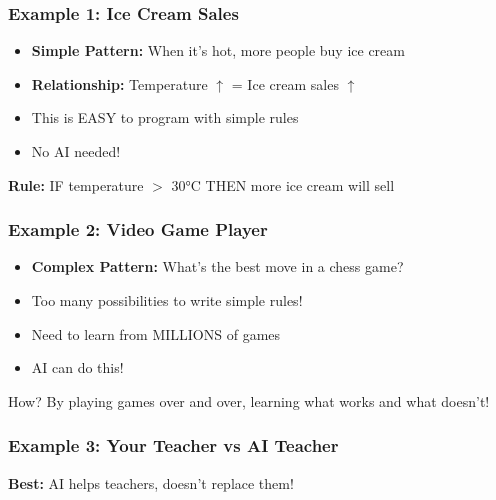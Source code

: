 \begin{frame}[fragile]\frametitle{Example 1: Ice Cream Sales}
\begin{itemize}
\item {\bf Simple Pattern:} When it's hot, more people buy ice cream
\item {\bf Relationship:} Temperature $\uparrow$ = Ice cream sales $\uparrow$
\item This is EASY to program with simple rules
\item No AI needed!
\end{itemize}

\vspace{0.5cm}
{\bf Rule:} IF temperature $>$ 30°C THEN more ice cream will sell
\end{frame}

\begin{frame}[fragile]\frametitle{Example 2: Video Game Player}
\begin{itemize}
\item {\bf Complex Pattern:} What's the best move in a chess game?
\item Too many possibilities to write simple rules!
\item Need to learn from MILLIONS of games
\item AI can do this!
\end{itemize}

\vspace{0.5cm}
How? By playing games over and over, learning what works and what doesn't!
\end{frame}

\begin{frame}[fragile]\frametitle{Example 3: Your Teacher vs AI Teacher}

\begin{center}
\end{center}

\vspace{0.5cm}
{\bf Best:} AI helps teachers, doesn't replace them!
\end{frame}

